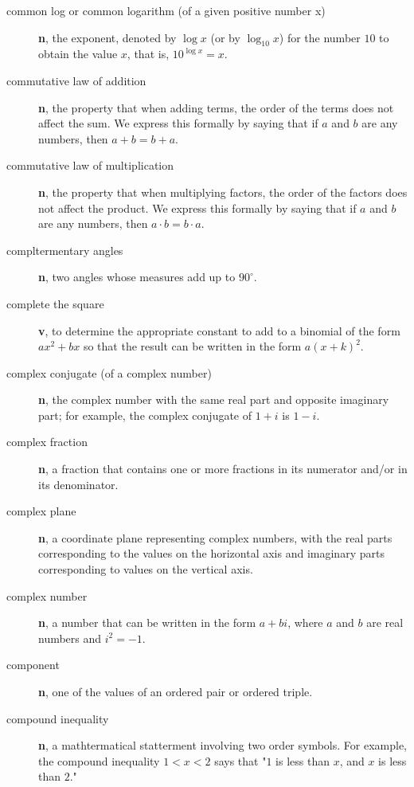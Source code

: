 \documentclass[10pt,]{book}
\newcommand{\terminology}[1]{\textbf{#1}}
\theoremstyle{plain}
\theoremstyle{definition}
\theoremstyle{definition}
\theoremstyle{definition}
\numberwithin{equation}{part}
\newcommand\degree[0]{^{\circ}}
\newcommand{\lt}{<}
\begin{document}
\begin{description}
\item[{common log or common logarithm (of a given positive number x)}]\hypertarget{li-493}{}\terminology{n}, the exponent, denoted by \(\log x\) (or by \(\log_{10} x\)) for the number \(10\) to obtain the value \(x\), that is, \(10^{\log x} = x\).%
\item[{commutative law of addition}]\hypertarget{li-494}{}\terminology{n}, the property that when adding terms, the order of the terms does not affect the sum. We express this formally by saying that if \(a\) and \(b\) are any numbers, then \(a + b = b + a\).%
\item[{commutative law of multiplication}]\hypertarget{li-495}{}\terminology{n}, the property that when multiplying factors, the order of the factors does not affect the product. We express this formally by saying that if \(a\) and \(b\) are any numbers, then \(a\cdot b = b\cdot a\).%
\item[{compltermentary angles}]\hypertarget{li-496}{}\terminology{n}, two angles whose measures add up to \(90\degree\).%
\item[{complete the square}]\hypertarget{li-497}{}\terminology{v}, to determine the appropriate constant to add to a binomial of the form \(ax^2 + bx\) so that the result can be written in the form \(a(x + k)^2\).%
\item[{complex conjugate (of a complex number)}]\hypertarget{li-498}{}\terminology{n}, the complex number with the same real part and opposite imaginary part; for example, the complex conjugate of \(1 + i\) is \(1 − i\).%
\item[{complex fraction}]\hypertarget{li-499}{}\terminology{n}, a fraction that contains one or more fractions in its numerator and/or in its denominator.%
\item[{complex plane}]\hypertarget{li-500}{}\terminology{n}, a coordinate plane representing complex numbers, with the real parts corresponding to the values on the horizontal axis and imaginary parts corresponding to values on the vertical axis.%
\item[{complex number}]\hypertarget{li-501}{}\terminology{n}, a number that can be written in the form \(a + bi\), where \(a\) and \(b\) are real numbers and \(i^2=−1\).%
\item[{component}]\hypertarget{li-502}{}\terminology{n}, one of the values of an ordered pair or ordered triple.%
\item[{compound inequality}]\hypertarget{li-503}{}\terminology{n}, a mathtermatical statterment involving two order symbols. For example, the compound inequality \(1\lt x\lt 2\) says that "\(1\) is less than \(x\), and \(x\) is less than \(2\)."%

\end{description}
\end{document}
